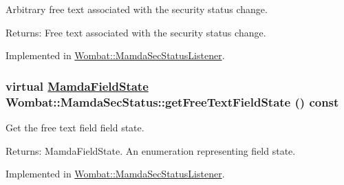 Arbitrary free text associated with the security status change. 

\begin{Desc}
\item[Returns:]Free text associated with the security status change. \end{Desc}


Implemented in \hyperlink{classWombat_1_1MamdaSecStatusListener_cfc40e59afe20f90ea1c0aa616397882}{Wombat::Mamda\-Sec\-Status\-Listener}.\hypertarget{classWombat_1_1MamdaSecStatus_f54b5d795c53c279499fc3fca9748622}{
\subsubsection[getFreeTextFieldState]{\setlength{\rightskip}{0pt plus 5cm}virtual \hyperlink{namespaceWombat_93aac974f2ab713554fd12a1fa3b7d2a}{Mamda\-Field\-State} Wombat::Mamda\-Sec\-Status::get\-Free\-Text\-Field\-State () const}}
\label{classWombat_1_1MamdaSecStatus_f54b5d795c53c279499fc3fca9748622}


Get the free text field field state. 

\begin{Desc}
\item[Returns:]Mamda\-Field\-State. An enumeration representing field state. \end{Desc}


Implemented in \hyperlink{classWombat_1_1MamdaSecStatusListener_b0f983bb92ba0f415d5e60ed6405c157}{Wombat::Mamda\-Sec\-Status\-Listener}.